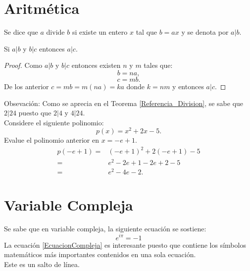 \section{Aritmética}
\begin{Def}
Se dice que $a$ divide $b$ si existe un entero $x$ tal que $b=ax$ y se denota por $a|b$.
\end{Def}
\begin{Teo}
\label{Referencia_Division}
Si $a|b$ y $b|c$ entonces $a|c$.
\end{Teo}
\begin{proof}
Como $a|b$ y $b|c$ entonces existen $n$ y $m$ tales que:
$$b=na,$$ 
$$c=mb.$$
De los anterior $c=mb=m(na)=ka$ donde $k=nm$ y entonces $a|c$.
\end{proof}
Obsevación: Como se aprecia en el Teorema \ref{Referencia_Division}, se sabe que $2|24$ puesto que $2|4$ y $4|24$.\\
Considere el siguiente polinomio:
$$p(x)=x^2+2x-5.$$
Evalue el polinomio anterior en $x=-e+1$.
\begin{align*}
p(-e+1)=&(-e+1)^2+2(-e+1)-5\\
=&e^2-2e+1-2e+2-5\\
=&e^2-4e-2.
\end{align*}
\section{Variable Compleja}
Se sabe que en variable compleja, la siguiente ecuación se sostiene:
\begin{equation}
\label{EcuacionCompleja}
e^{i\pi}=-1
\end{equation}
\sangria La ecuación \eqref{EcuacionCompleja} es interesante puesto que contiene los símbolos matemáticos más importantes contenidos en una sola ecuación.\\[1cm]
Este es un salto de línea.
